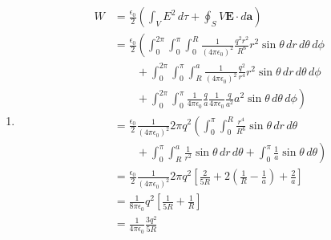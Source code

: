 \documentclass{article}
\renewcommand{\vec}[1]{\boldsymbol{\mathbf{#1}}}
\newcommand{\ke}{\frac{1}{4 \pi \epsilon_0}}
\begin{document}
\begin{enumerate}
  \item

        \begin{align*}
          W & = \frac{\epsilon_0}{2} \left( \int_V E^2 \,d \tau + \oint_S V \vec{E} \cdot d \vec{a} \right)                                                                         \\
            & = \frac{\epsilon_0}{2} \left( \int_0^{2 \pi} \int_0^\pi \int_0^R \frac{1}{(4 \pi \epsilon_0)^2} \frac{q^2 r^2}{R^6} r^2 \sin \theta \,d r \,d \theta \,d \phi \right. \\
            & \qquad + \int_0^{2 \pi} \int_0^\pi \int_R^a \frac{1}{(4 \pi \epsilon_0)^2} \frac{q^2}{r^4} r^2 \sin \theta \,d r \,d \theta \,d \phi                                  \\
            & \qquad + \left. \int_0^{2 \pi} \int_0^\pi \ke \frac{q}{a} \frac{1}{4 \pi \epsilon_0} \frac{q}{a^2} a^2 \sin \theta \,d \theta \,d \phi \right)                        \\
            & = \frac{\epsilon_0}{2} \frac{1}{(4 \pi \epsilon_0)^2} 2 \pi q^2 \left( \int_0^\pi \int_0^R \frac{r^4}{R^6} \sin \theta \,d r \,d \theta \right.                       \\
            & \qquad + \int_0^\pi \int_R^a \frac{1}{r^2} \sin \theta \,d r \,d \theta + \left. \int_0^\pi \frac{1}{a} \sin \theta \,d \theta \right)                                \\
            & = \frac{\epsilon_0}{2} \frac{1}{(4 \pi \epsilon_0)^2} 2 \pi q^2 \left[ \frac{2}{5 R} + 2 \left( \frac{1}{R} - \frac{1}{a} \right) + \frac{2}{a} \right]               \\
            & = \frac{1}{8 \pi \epsilon_0} q^2 \left[ \frac{1}{5 R} + \frac{1}{R} \right]                                                                                           \\
            & = \frac{1}{4 \pi \epsilon_0} \frac{3 q^2}{5 R}                                                                                                                        \\
        \end{align*}
\end{enumerate}

\setcounter{subsection}{35}
\subsection{}
\end{document}
